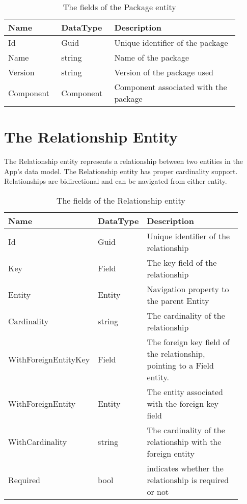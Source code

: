 \begin{table}[H]
\small
\begin{tabular}{ p{0.20\linewidth} p{0.20\linewidth} p{0.50\linewidth} }
\hline
\textbf{Name} & \textbf{DataType} & \textbf{Description} \\
\hline
Id & Guid & Unique identifier of the package \\
Name & string & Name of the package \\
Version & string & Version of the package used \\
Component & Component & Component associated with the package \\
\hline
\end{tabular}
\caption{The fields of the Package entity}
\label{table:package_entity}
\end{table}

\section{The Relationship Entity}

The Relationship entity represents a relationship between two entities in the App's data
model. The Relationship entity has proper cardinality support. Relationships are
bidirectional and can be navigated from either entity.

\begin{table}[H]
\small
\begin{tabular}{ p{0.25\linewidth} p{0.13\linewidth} p{0.53\linewidth} }
\hline
\textbf{Name} & \textbf{DataType} & \textbf{Description} \\
\hline
Id & Guid & Unique identifier of the relationship \\
Key & Field & The key field of the relationship \\
Entity & Entity & Navigation property to the parent Entity \\
Cardinality & string & The cardinality of the relationship \\
WithForeignEntityKey & Field & The foreign key field of the relationship, pointing to a
Field entity. \\
WithForeignEntity & Entity & The entity associated with the foreign key field \\
WithCardinality & string & The cardinality of the relationship with the foreign entity \\
Required & bool & indicates whether the relationship is required or not \\
\hline
\end{tabular}
\caption{The fields of the Relationship entity}
\label{table:relationship_entity}
\end{table}